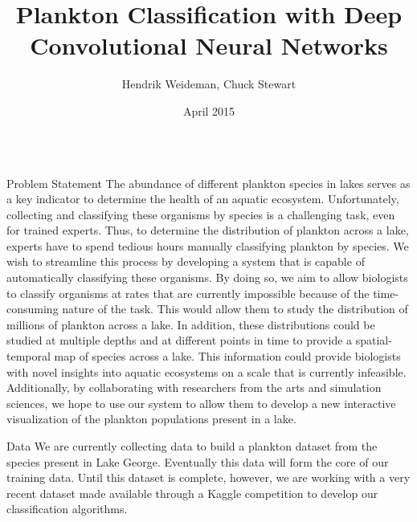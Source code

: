 \documentclass[final,hyperref={pdfpagelabels=false}]{beamer}
\title{\huge Plankton Classification with Deep Convolutional Neural Networks}
\author{Hendrik Weideman, Chuck Stewart}
\institute{Department of Computer Science\\Rensselaer Polytechnic Institute}
\date[April 2015]{April 2015}
\begin{document}
\begin{frame}
  \begin{columns}[T]
  	\begin{column}{.32\textwidth}
      \begin{block}{Problem Statement}
        The abundance of different plankton species in lakes serves as a key indicator to determine the health of an aquatic ecosystem.
        Unfortunately, collecting and classifying these organisms by species is a challenging task, even for trained experts.  Thus,
        to determine the distribution of plankton across a lake, experts have to spend tedious hours manually classifying plankton by
        species.  We wish to streamline this process by developing a system that is capable of automatically classifying these organisms.
        By doing so, we aim to allow biologists to classify organisms at rates that are currently impossible because of the
        time-consuming nature of the task.  This would allow them to study the distribution of millions of plankton across a lake.  In
        addition, these distributions could be studied at multiple depths and at different points in time to provide a spatial-temporal
        map of species across a lake.  This information could provide biologists with novel insights into aquatic ecosystems on a scale
        that is currently infeasible.  Additionally, by collaborating with researchers from the arts and simulation sciences, we hope to
        use our system to allow them to develop a new interactive visualization of the plankton populations present in a lake.
      \end{block}

      \begin{block}{Data}
        We are currently collecting data to build a plankton dataset from the species present in Lake George.  Eventually this data
        will form the core of our training data.  Until this dataset is complete, however, we are working with a very recent dataset
        made available through a Kaggle competition to develop our classification algorithms.
        \begin{figure}
          \begin{minipage}{.5\textwidth}
            \centering


\end{minipage}
\end{figure}
\end{block}
\end{column}
\end{columns}
\end{frame}
\end{document}
